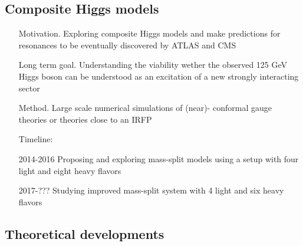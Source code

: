 \documentclass[prd,showpacs,showkeys,preprintnumbers,floatfix,
nofootinbib%
]{revtex4-2}
\begin{document}
\subsection{Composite Higgs models}
\begin{itemize}
    \item[Motivation.] Exploring composite Higgs models and make
     predictions for resonances to be eventually discovered by ATLAS
     and CMS
    \item[Long term goal.] Understanding the viability wether the
     observed 125 GeV Higgs boson can be understood as an excitation of
     a new strongly interacting sector
    \item[Method.] Large scale numerical simulations of (near)-
     conformal gauge theories or theories close to an IRFP
    \item[Timeline:]
    \item[2014-2016] Proposing and exploring mass-split models using a
     setup with four light and eight heavy flavors
    \item[2017-???] Studying improved mass-split system with 4 light
     and six heavy flavors
\end{itemize}


\subsection{Theoretical developments}

\newpage

\appendix

%


\end{document}
